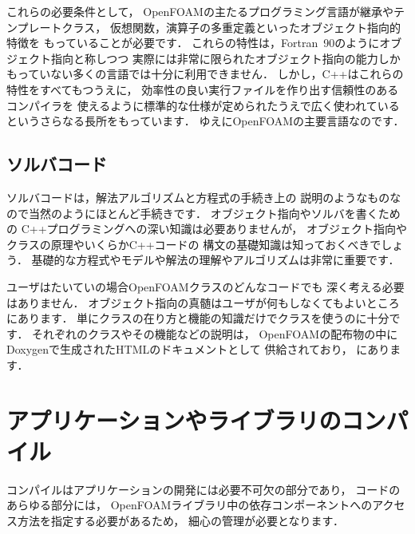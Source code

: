 これらの必要条件として，
OpenFOAMの主たるプログラミング言語が継承やテンプレートクラス，
仮想関数，演算子の多重定義といったオブジェクト指向的特徴を
もっていることが必要です．
これらの特性は，Fortran~90のようにオブジェクト指向と称しつつ
実際には非常に限られたオブジェクト指向の能力しか
もっていない多くの言語では十分に利用できません．
しかし，C++はこれらの特性をすべてもつうえに，
効率性の良い実行ファイルを作り出す信頼性のあるコンパイラを
使えるように標準的な仕様が定められたうえで広く使われている
というさらなる長所をもっています．
ゆえにOpenFOAMの主要言語なのです．


\subsection{ソルバコード}
\label{ssec:3.1.4}
ソルバコードは，解法アルゴリズムと方程式の手続き上の
説明のようなものなので当然のようにほとんど手続きです．
オブジェクト指向やソルバを書くための
C++プログラミングへの深い知識は必要ありませんが，
オブジェクト指向やクラスの原理やいくらかC++コードの
構文の基礎知識は知っておくべきでしょう．
基礎的な方程式やモデルや解法の理解やアルゴリズムは非常に重要です．

ユーザはたいていの場合OpenFOAMクラスのどんなコードでも
深く考える必要はありません．
オブジェクト指向の真髄はユーザが何もしなくてもよいところにあります．
単にクラスの在り方と機能の知識だけでクラスを使うのに十分です．
それぞれのクラスやその機能などの説明は，
OpenFOAMの配布物の中にDoxygenで生成されたHTMLのドキュメントとして
供給されており，
にあります．



\section{アプリケーションやライブラリのコンパイル}
\label{sec:3.2}
コンパイルはアプリケーションの開発には必要不可欠の部分であり，
コードのあらゆる部分には，
OpenFOAMライブラリ中の依存コンポーネントへのアクセス方法を指定する必要があるため，
細心の管理が必要となります．

